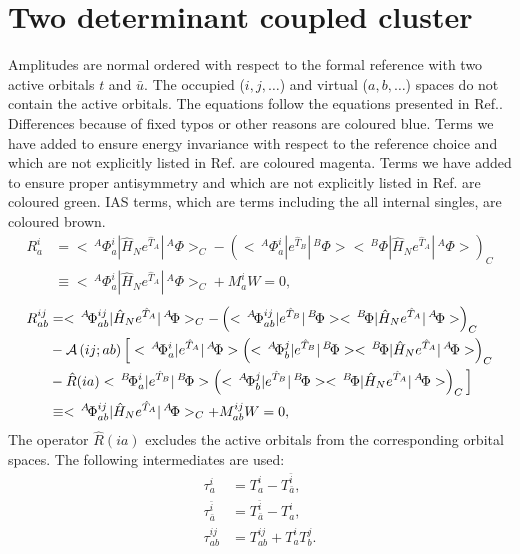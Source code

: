 \documentclass[a4paper,12pt,oneside]{book}
\newcommand{\blue}[1]{{\color{blue} #1}}
\newcommand{\magenta}[1]{{\color{magenta} #1}}
\newcommand{\brown}[1]{{\color{brown} #1}}
\newcommand{\green}[1]{{\color{pinegreen} #1}}
\newcommand{\NL}{\nonumber \\}
\newcommand{\op}{\hat}
\newcommand{\ASop}[2]{{\cal A}\left(#1;#2\right)}
\newcommand{\spa}[1]{{#1}}
\newcommand{\spb}[1]{\bar{#1}}
\newcommand{\pre}[1]{\,#1\!}
\begin{document}
\chapter{Two determinant coupled cluster}
Amplitudes are normal ordered with respect to the formal reference with two active orbitals $t$ and $\spb{u}$.
The occupied ($i,j,\ldots$) and virtual ($a,b,\ldots$) spaces do not contain the active orbitals.
The equations follow the equations presented in Ref.\cite{szalay94}.
Differences because of fixed typos or other reasons are coloured \blue{blue}.
Terms we have added to ensure energy invariance with respect to the reference choice 
and which are not explicitly listed in Ref.\cite{szalay94} are coloured \magenta{magenta}.
Terms we have added to ensure proper antisymmetry and which are not explicitly listed in Ref.\cite{szalay94} are coloured \green{green}.
IAS terms, which are terms including the all internal singles, are coloured \brown{brown}.
\begin{align}
R^i_a &= < \pre{^A}\Phi^i_a |\op H_N e^{\op T_A} | \pre{^A} \Phi >_C - \left( < \pre{^A}\Phi^i_a | e^{\op T_B} | \pre{^B}\Phi ><\pre{^B}\Phi | \op H_N e^{\op T_A} | \pre{^A} \Phi> \right)_C \NL
      &\equiv < \pre{^A}\Phi^i_a | \op H_N e^{\op T_A} | \pre{^A} \Phi >_C + M^i_a W = 0,
\end{align}
\begin{align}
R^{ij}_{ab} &= <\pre{^A}\Phi^{ij}_{ab} |\op H_N e^{\op T_A}| \pre{^A} \Phi>_C - \left( <\pre{^A} \Phi^{ij}_{ab} |e^{\op T_B}| \pre{^B} \Phi><\pre{^B}\Phi |\op H_N e^{\op T_A}| \pre{^A}\Phi> \right)_C \NL
            &-\ASop{ij}{ab} \Big[ <\pre{^A} \Phi^i_a |e^{\op T_A}| \pre{^A}\Phi> \left( <\pre{^A}\Phi^j_b |e^{\op T_B}| \pre{^B}\Phi> <\pre{^B}\Phi |\op H_N e^{\op T_A}| \pre{^A}\Phi>  \right)_C \NL
                           &- \op R(ia) <\pre{^B} \Phi^i_a |e^{\op T_B}| \pre{^B}\Phi> \left( <\pre{^A}\Phi^j_b |e^{\op T_B}| \pre{^B}\Phi> <\pre{^B}\Phi |\op H_N e^{\op T_A}| \pre{^A}\Phi> \right)_C \Big] \NL
            &\equiv <\pre{^A}\Phi^{ij}_{ab} |\op H_N e^{\op T_A}| \pre{^A}\Phi>_C + M^{ij}_{ab} W = 0,
\end{align}
The operator $\op R(ia)$ excludes the active orbitals from the corresponding orbital spaces.
The following intermediates are used:
\begin{align}
\tau^{\spa{i}}_{\spa{a}}               &= T^{\spa{i}}_{\spa{a}} - T^{\spb{i}}_{\spb{a}}, \\
\tau^{\spb{i}}_{\spb{a}}               &= T^{\spb{i}}_{\spb{a}} - T^{\spa{i}}_{\spa{a}}, \\
\tau^{\spa{i}\spa{j}}_{\spa{a}\spa{b}} &= T^{\spa{i}\spa{j}}_{\spa{a}\spa{b}} + T^{\spa{i}}_{\spa{a}} T^{\spa{j}}_{\spa{b}}.
\end{align}
\end{document}
